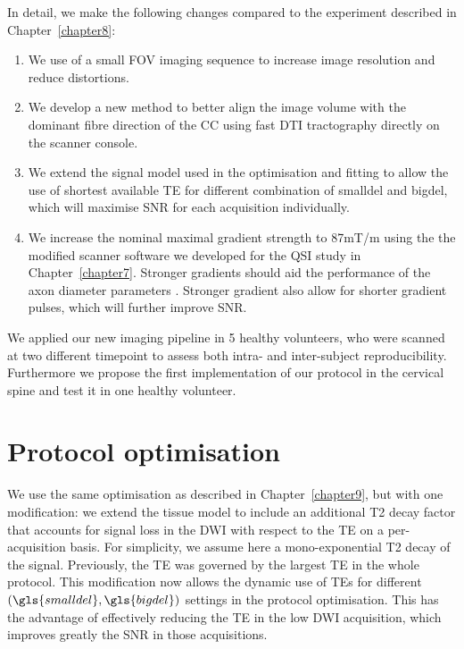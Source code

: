 In detail, we make the following changes compared to the \SFasym{} experiment described in Chapter~\ref{chapter8}:
\begin{enumerate}
\item We use of a small \gls{FOV} imaging sequence to increase image resolution and reduce distortions.
\item We develop a new method to better align the image volume with the dominant fibre direction of the CC using fast DTI tractography directly on the scanner console.
\item We extend the signal model used in the optimisation and fitting to allow the use of shortest available \gls{TE} for different combination of \gls{smalldel} and \gls{bigdel}, which will maximise SNR for each acquisition individually.
\item We increase the nominal maximal gradient strength to 87mT/m using the the modified scanner software we developed for the QSI study in Chapter~\ref{chapter7}. Stronger gradients should aid the performance of the axon diameter parameters \citep{Dyrby:2010}. Stronger gradient also allow for shorter gradient pulses, which will further improve SNR.
\end{enumerate}
We applied our new imaging pipeline in 5 healthy volunteers, who were scanned at two different timepoint to assess both intra- and inter-subject reproducibility. Furthermore we propose the first implementation of our \SFasym{} protocol in the cervical spine and test it in one healthy volunteer. 


\section{Protocol optimisation}
We use the same \SFasym{} optimisation as described in Chapter~\ref{chapter9}, but with one modification: we extend the tissue model to include an additional T2 decay factor that accounts for signal loss in the DWI with respect to the \gls{TE} on a per-acquisition basis. For simplicity, we assume here a mono-exponential T2 decay of the signal. Previously, the \gls{TE} was governed by the largest TE in the whole protocol. This modification now allows the dynamic use of \glspl{TE} for different $(\gls{smalldel},\gls{bigdel})$ settings in the protocol optimisation. This has the advantage of effectively reducing the \gls{TE} in the low DWI acquisition, which improves greatly the SNR in those acquisitions.


